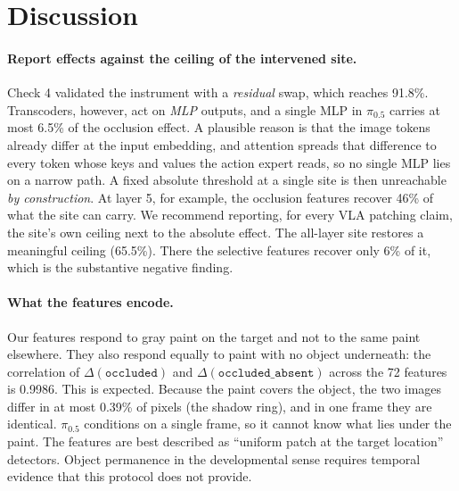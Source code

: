 \documentclass{article} %
\newcommand{\pifive}{$\pi_{0.5}$}
\newcommand{\occ}{\texttt{occluded}}
\newcommand{\cond}[1]{\texttt{#1}}
\begin{document}
\section{Discussion}
\label{sec:discussion}

\paragraph{Report effects against the ceiling of the intervened site.} Check 4 validated the instrument with a \emph{residual} swap, which reaches 91.8\%. Transcoders, however, act on \emph{MLP} outputs, and a single MLP in \pifive{} carries at most 6.5\% of the occlusion effect. A plausible reason is that the image tokens already differ at the input embedding, and attention spreads that difference to every token whose keys and values the action expert reads, so no single MLP lies on a narrow path. A fixed absolute threshold at a single site is then unreachable \emph{by construction}. At layer 5, for example, the occlusion features recover 46\% of what the site can carry. We recommend reporting, for every VLA patching claim, the site's own ceiling next to the absolute effect. The all-layer site restores a meaningful ceiling (65.5\%). There the selective features recover only 6\% of it, which is the substantive negative finding.

\paragraph{What the features encode.} Our features respond to gray paint on the target and not to the same paint elsewhere. They also respond equally to paint with no object underneath: the correlation of $\Delta(\occ)$ and $\Delta(\cond{occluded\_absent})$ across the 72 features is 0.9986. This is expected. Because the paint covers the object, the two images differ in at most 0.39\% of pixels (the shadow ring), and in one frame they are identical. \pifive{} conditions on a single frame, so it cannot know what lies under the paint. The features are best described as ``uniform patch at the target location'' detectors. Object permanence in the developmental sense \citep{baillargeon1985object} requires temporal evidence that this protocol does not provide.
\end{document}
